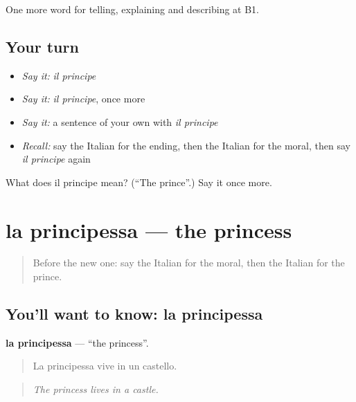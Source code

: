 \begin{grammarlens}[title={What you've built}]
One more word for telling, explaining and describing at B1.
\end{grammarlens}

\subsection*{Your turn}
\begin{itemize}
\raggedright
  \item \emph{Say it:} \emph{il principe}
  \item \emph{Say it:} \emph{il principe}, once more
  \item \emph{Say it:} a sentence of your own with \emph{il principe}
  \item \emph{Recall:} say the Italian for the ending, then the Italian for the moral, then say \emph{il principe} again
\end{itemize}

\begin{tcolorbox}[breakable,colback=teal!4,colframe=teal!35!black,title={Before you move on}]
What does il principe mean? (\textquotedblleft{}The prince\textquotedblright{}.) Say it once more.
\end{tcolorbox}
\section[la principessa]{la principessa — the princess}

\label{lesson:IT-C325-principessa}



\begin{quote}
Before the new one: say the Italian for the moral, then the Italian for the prince.
\end{quote}

\subsection*{You'll want to know: la principessa}
\textbf{la principessa} — \textquotedblleft{}the princess\textquotedblright{}.

\begin{quote}
La principessa vive in un castello.
\end{quote}

\begin{quote}
\emph{The princess lives in a castle.}
\end{quote}

